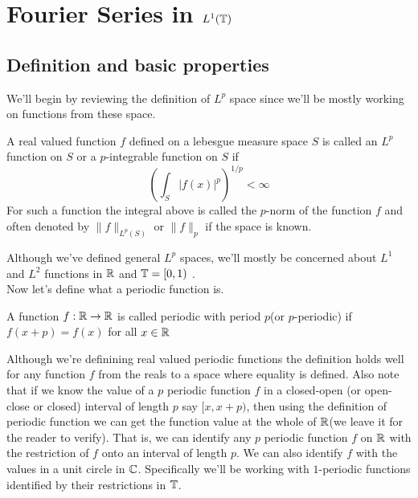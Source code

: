 \newpage
\section{Fourier Series in $L^1(\mathbb T)$}

  \subsection{Definition and basic properties}

    We'll begin by reviewing the definition of $L^p$ space since we'll be mostly working on functions from these space.
  \begin{definition}[$L^p$ function]
    \label{def:Lp_function}
    A real valued function $f$ defined on a lebesgue measure space $S$ is called an $L^p$ function on $S$ or a $p$-integrable function on $S$ if 
    \begin{displaymath}
       \left( \int_{S} |f(x)|^p \right)^{1/p} < \infty
    \end{displaymath}
    For such a function the integral above is called the $p$-norm of the function $f$ and often denoted by $\|f\|_{L^p(S)}$ or $\|f\|_p$ if the space is known.
\end{definition}  
  Although we've defined general $L^p$ spaces, we'll mostly be concerned about $L^1$ and $L^2$ functions in $\mathbb R$ and $\mathbb T = [0, 1)$ .
  \\

  Now let's define what a periodic function is.
  \begin{definition}
    \label{def:periodic_function}
    A function $f:\mathbb R \to \mathbb R$ is called periodic with period $p$(or $p$-periodic) if $f(x+p) = f(x)$ for all $x \in \mathbb R$

  \end{definition}
  Although we're definining real valued periodic functions the definition holds well for any function $f$ from the reals to a space where equality is defined.
  Also note that if we know the value of a $p$ periodic function $f$ in a closed-open (or open-close or closed) interval of length $p$ say $[x, x+p)$, then using the definition of periodic function we can get the function value at the whole of $\mathbb R$(we leave it for the reader to verify). That is, we can identify any $p$ periodic function $f$ on $\mathbb R$ with the restriction of $f$ onto an interval of length $p$. We can also identify $f$ with the values in a unit circle in $\mathbb C$.
  Specifically we'll be working with $1$-periodic functions identified by their restrictions in $\mathbb T$.
\\

